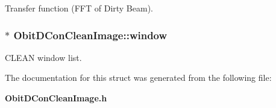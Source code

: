 Transfer function (FFT of Dirty Beam). 

\subsubsection{$\ast$ {\bf Obit\-DCon\-Clean\-Image::window}}\label{structObitDConCleanImage_o9}


CLEAN window list. 



The documentation for this struct was generated from the following file:\begin{CompactItemize}
\item 
{\bf Obit\-DCon\-Clean\-Image.h}\end{CompactItemize}
